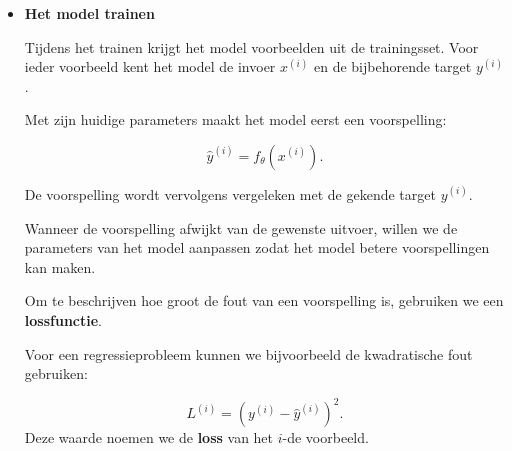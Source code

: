 \documentclass{ximera}
\begin{document}
\begin{itemize}
Er bestaan verschillende soorten Machine Learning-modellen. Elk model
probeert op een bepaalde manier een verband te beschrijven tussen de
invoer $x$ en de gewenste uitvoer $y$.

Voorbeelden van modellen zijn:

\begin{itemize}
    \item lineaire regressie;
    \item beslissingsbomen;
    \item random forests;
    \item neurale netwerken.
\end{itemize}

De keuze van het model hangt onder andere af van het soort probleem, de
beschikbare gegevens en de complexiteit van het verband dat we willen
leren.

We kunnen het gekozen model algemeen voorstellen als

\[
\hat{y}=f_\theta(x),
\]

waarbij $\theta$ de parameters van het model voorstelt.

De parameters bepalen het precieze gedrag van het model. Tijdens het
trainen worden deze parameters aangepast op basis van de beschikbare
trainingsgegevens.

\item \textbf{Het model trainen}

Tijdens het trainen krijgt het model voorbeelden uit de trainingsset.
Voor ieder voorbeeld kent het model de invoer $x^{(i)}$ en de
bijbehorende target $y^{(i)}$.

Met zijn huidige parameters maakt het model eerst een voorspelling:

\[\hat{y}^{(i)} = f_\theta(x^{(i)}).\]

De voorspelling wordt vervolgens vergeleken met de gekende target $y^{(i)}$. 

Wanneer de voorspelling afwijkt van de gewenste uitvoer, willen we de parameters van het model aanpassen zodat het model betere voorspellingen
kan maken.

Om te beschrijven hoe groot de fout van een voorspelling is, gebruiken we een \textbf{lossfunctie}.

Voor een regressieprobleem kunnen we bijvoorbeeld de kwadratische fout
gebruiken:

\[L^{(i)} =\left(y^{(i)}-\hat{y}^{(i)}\right)^2.
\]
Deze waarde noemen we de \textbf{loss} van het $i$-de voorbeeld.


\end{itemize}
\end{document}
